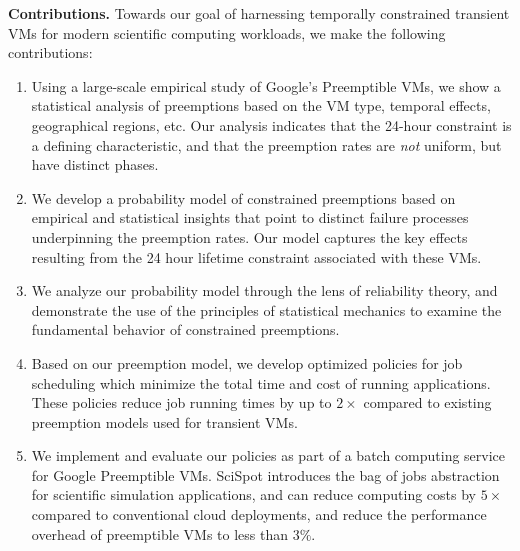 \noindent \textbf{Contributions.}
%
Towards our goal of harnessing temporally constrained transient VMs for modern scientific computing workloads, 
we make the following contributions:
\begin{enumerate} [leftmargin=12pt]
\item Using a large-scale empirical study of Google's Preemptible VMs, we show a statistical analysis of preemptions based on the VM type, temporal effects, geographical regions, etc. Our analysis indicates that the 24-hour constraint is a defining characteristic, and that the preemption rates are \emph{not} uniform, but have distinct phases. 

\item We develop a probability model of constrained preemptions based on empirical and statistical insights that point to distinct failure processes underpinning the preemption rates. Our model captures the key effects resulting from the 24 hour lifetime constraint associated with these VMs.

\item We analyze our probability model through the lens of reliability theory, and demonstrate the use of the principles of statistical mechanics to examine the fundamental behavior of constrained preemptions. 
  


\item Based on our preemption model, we develop optimized policies for job scheduling which minimize the total time and cost of running applications. These policies reduce job running times by up to $2\times$ compared to existing preemption models used for transient VMs. 
  

\item We implement and evaluate our policies as part of a batch computing service for Google Preemptible VMs. SciSpot introduces the bag of jobs abstraction for scientific simulation applications, and can reduce computing costs by $5\times$ compared to conventional cloud deployments, and reduce the performance overhead of preemptible VMs to less than $3\%$. 


\end{enumerate}
